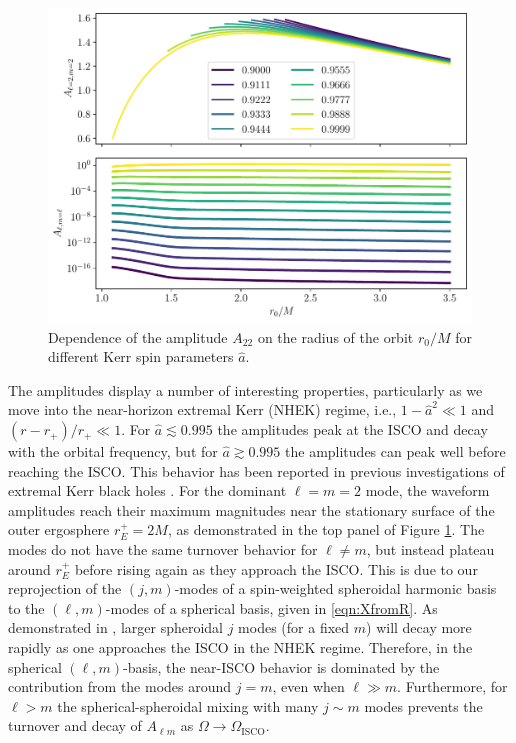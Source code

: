 \documentclass[%
 reprint,
 nofootinbib,
 amsmath,amssymb,
 aps,
 prd,
]{revtex4-2}
\begin{document}
\begin{figure}[!htp]
    \centering
    \includegraphics[width=0.98\linewidth]{figures/amp_combined.pdf}
    \caption{Dependence of the amplitude $A_{22}$ on the radius of the orbit $r_0/M$ for different Kerr spin parameters $\hat{a}$.}
    \label{fig:amplitudeVariation}
\end{figure}


The amplitudes display a number of interesting properties, particularly as we move into the near-horizon extremal Kerr (NHEK) regime, i.e., $1-\hat{a}^2 \ll 1$ and $(r-r_+)/r_+ \ll 1$. For $\hat{a} \lesssim 0.995$ the amplitudes peak at the ISCO and decay with the orbital frequency, but for $\hat{a} \gtrsim 0.995$ the amplitudes can peak well before reaching the ISCO. This behavior has been reported in previous investigations of extremal Kerr black holes \cite{GralPorfWarb15, GralHughWarb16}. For the dominant $\ell = m = 2$ mode, the waveform amplitudes reach their maximum magnitudes near the stationary surface of the outer ergosphere $r_E^+ = 2M$, as demonstrated in the top panel of Figure \ref{fig:amplitudeVariation}. The modes do not have the same turnover behavior for $\ell \neq m$, but instead plateau around $r_E^+$ before rising again as they approach the ISCO. This is due to our reprojection of the $(j, m)$-modes of a spin-weighted spheroidal harmonic basis to the $(\ell, m)$-modes of a spherical basis, given in \eqref{eqn:XfromR}. As demonstrated in \cite{GralPorfWarb15}, larger spheroidal $j$ modes (for a fixed $m$) will decay more rapidly as one approaches the ISCO in the NHEK regime. Therefore, in the spherical $(\ell, m)$-basis, the near-ISCO behavior is dominated by the contribution from the modes around $j=m$, even when $\ell \gg m$. Furthermore, for $\ell > m$ the spherical-spheroidal mixing with many $j\sim m$ modes prevents the turnover and decay of $A_{\ell m}$ as $\Omega \rightarrow \Omega_\mathrm{ISCO}$.
\end{document}
